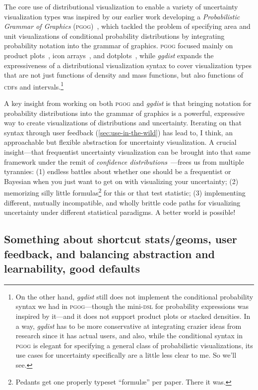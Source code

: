 \documentclass[journal]{vgtc}                     %
\begin{document}
The core use of distributional visualization to enable a variety of uncertainty visualization types was inspired by our earlier work developing a \textit{Probabilistic Grammar of Graphics} (\textsc{pgog})~\cite{pu2020probabilistic}, which tackled the problem of specifying area and unit visualizations of conditional probability distributions by integrating probability notation into the grammar of graphics. \textsc{pgog} focused mainly on product plots~\cite{wickham2011product}, icon arrays~\cite{ancker2006design}, and dotplots~\cite{wilkinson1999dot}, while \textit{ggdist} expands the expressiveness of a distributional visualization syntax to cover visualization types that are not just functions of density and mass functions, but also functions of \textsc{cdf}s and intervals.\footnote{On the other hand, \textit{ggdist} still does not implement the conditional probability syntax we had in \textsc{pgog}---though the mini-\textsc{dsl} for probability expressions was inspired by it---and it does not support product plots or stacked densities. In a way, \textit{ggdist} has to be more conservative at integrating crazier ideas from research since it has actual users, and also, while the conditional syntax in \textsc{pgog} is elegant for specifying a general class of probabilistic visualizations, its use cases for uncertainty specifically are a little less clear to me. So we'll see.} 

A key insight from working on both \textsc{pgog} and \textit{ggdist} is that bringing notation for probability distributions into the grammar of graphics is a powerful, expressive way to create visualizations of distributions and uncertainty. Iterating on that syntax through user feedback 
(\cref{sec:use-in-the-wild}) has lead to, I think, an approachable but flexible abstraction for uncertainty visualization. A crucial insight---that frequentist uncertainty visualization can be brought into that same framework under the remit of \textit{confidence distributions}~\cite{xie2013confidence}---frees us from multiple tyrannies: (1) endless battles about whether one should be a frequentist or Bayesian when you just want to get on with visualizing your uncertainty; (2) memorizing silly little formulas\footnote{Pedants get one properly typeset ``formul\ae'' per paper. There it was.} for this or that test statistic; (3) implementing different, mutually incompatible, and wholly brittle code paths for visualizing uncertainty under different statistical paradigms. A better world is possible!

\subsection{Something about shortcut stats/geoms, user feedback, and balancing abstraction and learnability, good defaults}
\end{document}
